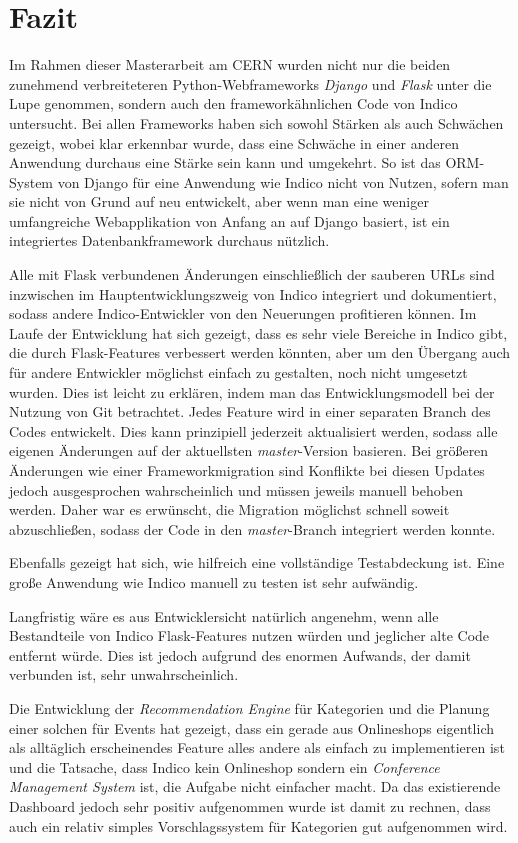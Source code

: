\chapter{Fazit}

Im Rahmen dieser Masterarbeit am CERN wurden nicht nur die beiden zunehmend verbreiteteren
Python-Webframeworks \emph{Django} und \emph{Flask} unter die Lupe genommen, sondern auch den
frameworkähnlichen Code von Indico untersucht. Bei allen Frameworks haben sich sowohl Stärken als
auch Schwächen gezeigt, wobei klar erkennbar wurde, dass eine Schwäche in einer anderen Anwendung
durchaus eine Stärke sein kann und umgekehrt. So ist das ORM-System von Django für eine Anwendung
wie Indico nicht von Nutzen, sofern man sie nicht von Grund auf neu entwickelt, aber wenn man eine
weniger umfangreiche Webapplikation von Anfang an auf Django basiert, ist ein integriertes
Datenbankframework durchaus nützlich.

Alle mit Flask verbundenen Änderungen einschließlich der sauberen URLs sind inzwischen im
Hauptentwicklungszweig von Indico integriert und dokumentiert, sodass andere Indico-Entwickler von
den Neuerungen profitieren können. Im Laufe der Entwicklung hat sich gezeigt, dass es sehr viele
Bereiche in Indico gibt, die durch Flask-Features verbessert werden könnten, aber um den Übergang
auch für andere Entwickler möglichst einfach zu gestalten, noch nicht umgesetzt wurden. Dies ist
leicht zu erklären, indem man das Entwicklungsmodell bei der Nutzung von Git betrachtet. Jedes
Feature wird in einer separaten Branch des Codes entwickelt. Dies kann prinzipiell jederzeit
aktualisiert werden, sodass alle eigenen Änderungen auf der aktuellsten \emph{master}-Version
basieren. Bei größeren Änderungen wie einer Frameworkmigration sind Konflikte bei diesen Updates
jedoch ausgesprochen wahrscheinlich und müssen jeweils manuell behoben werden. Daher war es
erwünscht, die Migration möglichst schnell soweit abzuschließen, sodass der Code in den
\emph{master}-Branch integriert werden konnte.

Ebenfalls gezeigt hat sich, wie hilfreich eine vollständige Testabdeckung ist. Eine große Anwendung
wie Indico manuell zu testen ist sehr aufwändig.

Langfristig wäre es aus Entwicklersicht natürlich angenehm, wenn alle Bestandteile von Indico
Flask-Features nutzen würden und jeglicher alte Code entfernt würde. Dies ist jedoch aufgrund des
enormen Aufwands, der damit verbunden ist, sehr unwahrscheinlich.

Die Entwicklung der \emph{Recommendation Engine} für Kategorien und die Planung einer solchen für
Events hat gezeigt, dass ein gerade aus Onlineshops eigentlich als alltäglich erscheinendes Feature
alles andere als einfach zu implementieren ist und die Tatsache, dass Indico kein Onlineshop sondern
ein \emph{Conference Management System} ist, die Aufgabe nicht einfacher macht. Da das existierende
Dashboard jedoch sehr positiv aufgenommen wurde ist damit zu rechnen, dass auch ein relativ simples
Vorschlagssystem für Kategorien gut aufgenommen wird.
